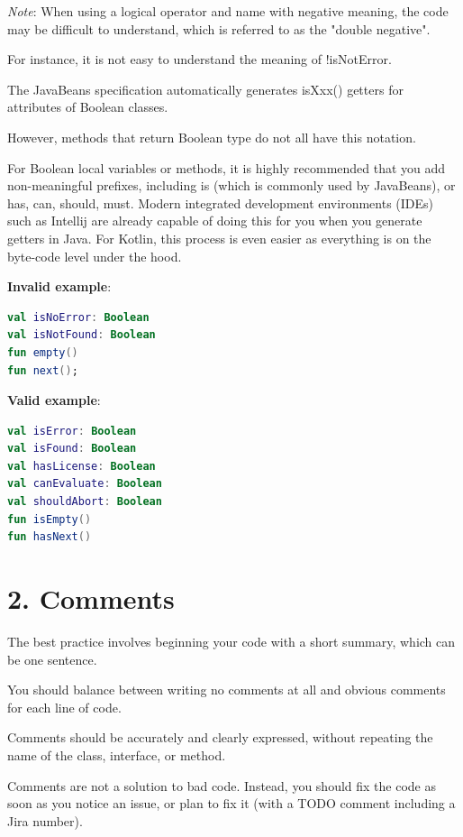 \textit{Note}: When using a logical operator and name with negative meaning, the code may be difficult to understand, which is referred to as the "double negative".

For instance, it is not easy to understand the meaning of !isNotError.

The JavaBeans specification automatically generates isXxx() getters for attributes of Boolean classes.

However, methods that return Boolean type do not all have this notation.

For Boolean local variables or methods, it is highly recommended that you add non-meaningful prefixes, including is (which is commonly used by JavaBeans), or has, can, should, must. Modern integrated development environments (IDEs) such as Intellij are already capable of doing this for you when you generate getters in Java. For Kotlin, this process is even easier as everything is on the byte-code level under the hood.



\textbf{Invalid example}:

\begin{lstlisting}[language=Kotlin]
val isNoError: Boolean
val isNotFound: Boolean
fun empty()
fun next();
\end{lstlisting}


\textbf{Valid example}:

\begin{lstlisting}[language=Kotlin]
val isError: Boolean
val isFound: Boolean
val hasLicense: Boolean
val canEvaluate: Boolean
val shouldAbort: Boolean
fun isEmpty()
fun hasNext()
\end{lstlisting}
\section*{\textbf{2. Comments}}



The best practice involves beginning your code with a short summary, which can be one sentence.

You should balance between writing no comments at all and obvious comments for each line of code.

Comments should be accurately and clearly expressed, without repeating the name of the class, interface, or method.

Comments are not a solution to bad code. Instead, you should fix the code as soon as you notice an issue, or plan to fix it (with a TODO comment including a Jira number).


